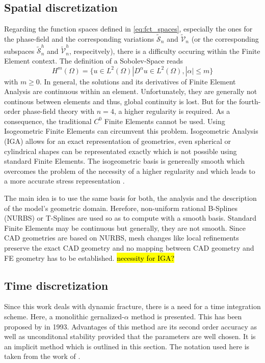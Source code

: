 \subsection{Spatial discretization} \label{sec:space_discr}
Regarding the function spaces defined in \eqref{eq:fct_spaces}, especially the ones for the phase-field and the corresponding variations $\tilde{\mathcal{S}}_{n}$ and $\tilde{\mathcal{V}}_{n}$ (or the corresponding subspaces $\tilde{\mathcal{S}}_{n}^{h}$ and $\tilde{\mathcal{V}}_{n}^{h}$, respecitvely), there is a difficulty occuring within the Finite Element context. The definition of a Sobolev-Space reads
\begin{equation} \label{eq:Hilbertspace}
	H^{m}\left(\Omega\right) = \{u\in L^{2}\left(\Omega\right)|D^{\alpha}u\in L^{2}\left(\Omega\right),|\alpha|\leq m\}
\end{equation}
with $m\geq0$. In general, the solutions and its derivatives of Finite Element Analysis are continuous within an element. Unfortunately, they are generally not continous between elements and thus, global continuity is lost. But for the fourth-order phase-field theory with $n=4$, a higher regularity is required. As a consequence, the traditional $C^{0}$ Finite Elements cannot be used. Using Isogeometric Finite Elements can circumvent this problem. Isogeometric Analysis (IGA) allows for an exact representation of geometries, even spherical or cylindrical shapes can be representated exactly which is not possible using standard Finite Elements. The isogeometric basis is genereally smooth which overcomes the problem of the necessity of a higher regularity and which leads to a more accurate stress representation \cite{01_PF_dyn_brittle}.

The main idea is to use the same basis for both, the analysis and the description of the model's geometric domain. Herefore, non-uniform rational B-Splines (NURBS) or T-Splines are used so as to compute with a smooth basis. Standard Finite Elements may be continuous but generally, they are not smooth. Since CAD geometries are based on NURBS, mesh changes like local refinements preserve the exact CAD geometry and no mapping between CAD geometry and FE geometry has to be established.
\hl{necessity for IGA?}


\subsection{Time discretization} \label{sec:time_discr}
Since this work deals with dynamic fracture, there is a need for a time integration scheme. Here, a monolithic gernalized-$\alpha$ method is presented. This has been proposed by \citet{10_PF_genAlpha} in 1993. Advantages of this method are its second order accuracy as well as unconditonal stability provided that the parameters are well chosen. It is an implicit method which is outlined in this section. The notation used here is taken from the work of \citet{01_PF_dyn_brittle}.

